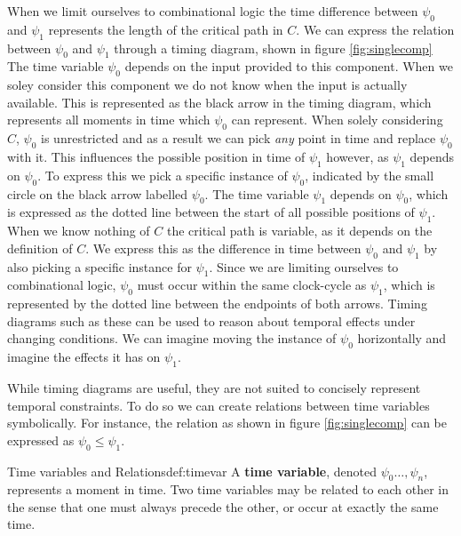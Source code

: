 When we limit ourselves to combinational logic the time difference between $\psi_0$ and $\psi_1$ represents the length of the critical path in $C$.
We can express the relation between $\psi_0$ and $\psi_1$ through a timing diagram, shown in figure \ref{fig:singlecomp}
The time variable $\psi_0$ depends on the input provided to this component.
When we soley consider this component we do not know when the input is actually available.
This is represented as the black arrow in the timing diagram, which represents all moments in time which $\psi_0$ can represent.
When solely considering $C$, $\psi_0$ is unrestricted and as a result we can pick \textit{any} point in time and replace $\psi_0$ with it.
This influences the possible position in time of $\psi_1$ however, as $\psi_1$ depends on $\psi_0$. 
To express this we pick a specific instance of $\psi_0$, indicated by the small circle on the black arrow labelled $\psi_0$.
The time variable $\psi_1$ depends on $\psi_0$, which is expressed as the dotted line between the start of all possible positions of $\psi_1$.
When we know nothing of $C$ the critical path is variable, as it depends on the definition of $C$. 
We express this as the difference in time between $\psi_0$ and $\psi_1$ by also picking a specific instance for $\psi_1$.
Since we are limiting ourselves to combinational logic, $\psi_0$ must occur within the same clock-cycle as $\psi_1$, which is represented by the dotted line between the endpoints of both arrows.
Timing diagrams such as these can be used to reason about temporal effects under changing conditions.
We can imagine moving the instance of $\psi_0$ horizontally and imagine the effects it has on $\psi_1$.

While timing diagrams are useful, they are not suited to concisely represent temporal constraints.
To do so we can create relations between time variables symbolically. 
For instance, the relation as shown in figure \ref{fig:singlecomp} can be expressed as $\psi_0 \le \psi_1$.

%
%
\begin{definitiontitled}{Time variables and Relations}{def:timevar}
A \textbf{time variable}, denoted $\psi_0 \ldots, \psi_n$, represents a moment in time.
Two time variables may be related to each other in the sense that one must always precede the other, or occur at exactly the same time.
\end{definitiontitled}


